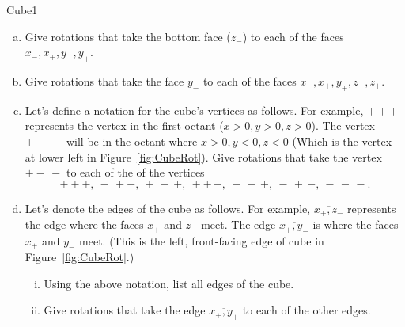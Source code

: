 \begin{exercise}{Cube1}
\begin{enumerate}[(a)]
\item Give rotations that take the bottom face ($z_-$) to each of the faces $x_-,x_+,y_-,y_+$.
\item Give rotations that take the face $y_- $ to each of the faces $x_-,x_+,y_+,z_-,z_+$.
\item Let's define a notation for the cube's vertices as follows.  For example, $+++$ represents the vertex in the first octant ($x>0,y>0,z>0$).  The vertex $+-\,-$ will be in the octant where $x>0,y<0,z<0$ (Which is the vertex at lower left in Figure~\ref{fig:CubeRot}).  Give rotations that take the vertex $+-\,-$ to each of the of the vertices 
\[ +++, ~-\,++,~+\,-\,+,~ ++\,-,~-\,-\,+,~-\,+\,-,~-\,-\,-. \]

\item Let's denote the edges of the cube as follows.  For example, $\overline{x_+,z_-}$ represents the edge where the faces $x_+$ and $z_-$ meet.  The edge $\overline{x_+,y_-}$ is where the faces $x_+$ and $y_-$ meet.  (This is the left, front-facing edge of cube in Figure~\ref{fig:CubeRot}.)  
\begin{enumerate}[(i)]
\item Using the above notation, list all edges of the cube.
\item Give rotations that take the edge $\overline{x_+,y_+}$ to each of the other edges. 
\end {enumerate}
\end{enumerate}
\end{exercise} 
